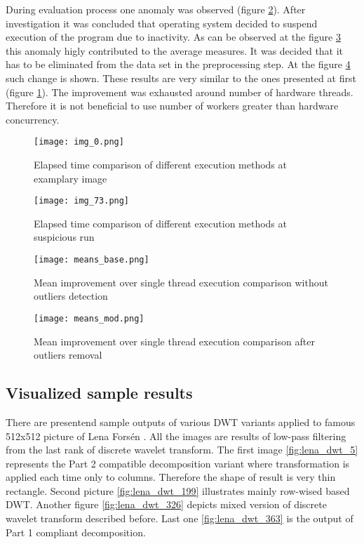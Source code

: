 During evaluation process one anomaly was observed (figure \ref{fig:time_comparison_sus}). After investigation
it was concluded that operating system decided to suspend execution of the program due to inactivity.
As can be observed at the figure \ref{fig:time_comparison_means_base} this anomaly higly contributed
to the average measures. It was decided that it has to be eliminated from the data set in the
preprocessing step. At the figure \ref{fig:time_comparison_means_mod} such change is shown.
These results are very similar to the ones presented at first (figure \ref{fig:time_comparison_example}).
The improvement was exhausted around number of hardware threads. Therefore it is not beneficial to
use number of workers greater than hardware concurrency.

\begin{figure}[!htb]
    \centering
    \texttt{[image: img\_0.png]}
    \caption{Elapsed time comparison of different execution methods at examplary image}
    \label{fig:time_comparison_example}
\end{figure}

\begin{figure}[!htb]
    \centering
    \texttt{[image: img\_73.png]}
    \caption{Elapsed time comparison of different execution methods at suspicious run}
    \label{fig:time_comparison_sus}
\end{figure}

\begin{figure}[!htb]
    \centering
    \texttt{[image: means\_base.png]}
    \caption{Mean improvement over single thread execution comparison without outliers detection}
    \label{fig:time_comparison_means_base}
\end{figure}

\begin{figure}[!htb]
    \centering
    \texttt{[image: means\_mod.png]}
    \caption{Mean improvement over single thread execution comparison after outliers removal}
    \label{fig:time_comparison_means_mod}
\end{figure}

\subsection{Visualized sample results}

There are presentend sample outputs of various DWT variants applied to famous 512x512 picture
of Lena Forsén \cite{lena}. All the images are results of low-pass filtering from the last
rank of discrete wavelet transform. The first image \ref{fig:lena_dwt_5} represents the Part 2
compatible decomposition variant where transformation is applied each time only to columns.
Therefore the shape of result is very thin rectangle. Second picture \ref{fig:lena_dwt_199}
illustrates mainly row-wised based DWT.
Another figure \ref{fig:lena_dwt_326} depicts mixed version of discrete wavelet transform described
before. Last one \ref{fig:lena_dwt_363} is the output of Part 1 compliant decomposition.


